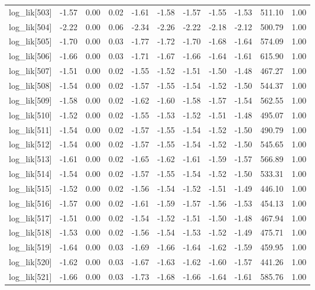 \begin{table}[ht]
\begin{tabular}{rrrrrrrrrrr}
  log\_lik[503] & -1.57 & 0.00 & 0.02 & -1.61 & -1.58 & -1.57 & -1.55 & -1.53 & 511.10 & 1.00 \\ 
  log\_lik[504] & -2.22 & 0.00 & 0.06 & -2.34 & -2.26 & -2.22 & -2.18 & -2.12 & 500.79 & 1.00 \\ 
  log\_lik[505] & -1.70 & 0.00 & 0.03 & -1.77 & -1.72 & -1.70 & -1.68 & -1.64 & 574.09 & 1.00 \\ 
  log\_lik[506] & -1.66 & 0.00 & 0.03 & -1.71 & -1.67 & -1.66 & -1.64 & -1.61 & 615.90 & 1.00 \\ 
  log\_lik[507] & -1.51 & 0.00 & 0.02 & -1.55 & -1.52 & -1.51 & -1.50 & -1.48 & 467.27 & 1.00 \\ 
  log\_lik[508] & -1.54 & 0.00 & 0.02 & -1.57 & -1.55 & -1.54 & -1.52 & -1.50 & 544.37 & 1.00 \\ 
  log\_lik[509] & -1.58 & 0.00 & 0.02 & -1.62 & -1.60 & -1.58 & -1.57 & -1.54 & 562.55 & 1.00 \\ 
  log\_lik[510] & -1.52 & 0.00 & 0.02 & -1.55 & -1.53 & -1.52 & -1.51 & -1.48 & 495.07 & 1.00 \\ 
  log\_lik[511] & -1.54 & 0.00 & 0.02 & -1.57 & -1.55 & -1.54 & -1.52 & -1.50 & 490.79 & 1.00 \\ 
  log\_lik[512] & -1.54 & 0.00 & 0.02 & -1.57 & -1.55 & -1.54 & -1.52 & -1.50 & 545.65 & 1.00 \\ 
  log\_lik[513] & -1.61 & 0.00 & 0.02 & -1.65 & -1.62 & -1.61 & -1.59 & -1.57 & 566.89 & 1.00 \\ 
  log\_lik[514] & -1.54 & 0.00 & 0.02 & -1.57 & -1.55 & -1.54 & -1.52 & -1.50 & 533.31 & 1.00 \\ 
  log\_lik[515] & -1.52 & 0.00 & 0.02 & -1.56 & -1.54 & -1.52 & -1.51 & -1.49 & 446.10 & 1.00 \\ 
  log\_lik[516] & -1.57 & 0.00 & 0.02 & -1.61 & -1.59 & -1.57 & -1.56 & -1.53 & 454.13 & 1.00 \\ 
  log\_lik[517] & -1.51 & 0.00 & 0.02 & -1.54 & -1.52 & -1.51 & -1.50 & -1.48 & 467.94 & 1.00 \\ 
  log\_lik[518] & -1.53 & 0.00 & 0.02 & -1.56 & -1.54 & -1.53 & -1.52 & -1.49 & 475.71 & 1.00 \\ 
  log\_lik[519] & -1.64 & 0.00 & 0.03 & -1.69 & -1.66 & -1.64 & -1.62 & -1.59 & 459.95 & 1.00 \\ 
  log\_lik[520] & -1.62 & 0.00 & 0.03 & -1.67 & -1.63 & -1.62 & -1.60 & -1.57 & 441.26 & 1.00 \\ 
  log\_lik[521] & -1.66 & 0.00 & 0.03 & -1.73 & -1.68 & -1.66 & -1.64 & -1.61 & 585.76 & 1.00 \\ 

\end{tabular}
\end{table}
